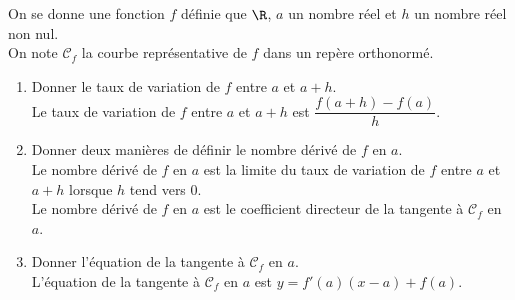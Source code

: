 \documentclass[a4paper,11pt,exos]{nsi}
\begin{document}
\newpage

\setcounter{section}{0}


\maketitle


On se donne une fonction $f$ définie que $\R$, $a$ un nombre réel et $h$ un nombre réel non nul.\\
On note $\mathcal{C}_f$ la courbe représentative de $f$ dans un repère orthonormé.
\begin{enumerate}
    \item Donner le taux de variation de $f$ entre $a$ et $a+h$.\\[.5em]
    \textcolor{UGLiBlue}{
        Le taux de variation de $f$ entre $a$ et $a+h$ est $\dfrac{f(a+h)-f(a)}{h}$.
    }
    \item Donner deux manières de définir le nombre dérivé de $f$ en $a$.\\[.5em]
    \textcolor{UGLiBlue}{
        Le nombre dérivé de $f$ en $a$ est la limite du taux de variation de $f$ entre $a$ et $a+h$ lorsque $h$ tend vers 0.\\
        Le nombre dérivé de $f$ en $a$ est le coefficient directeur de la tangente à $\mathcal{C}_f$ en $a$.
    }
    \item Donner l'équation de la tangente à $\mathcal{C}_f$ en $a$.\\[.5em]
    \textcolor{UGLiBlue}{
        L'équation de la tangente à $\mathcal{C}_f$ en $a$ est $y=f'(a)(x-a)+f(a)$.
    }
\end{enumerate}


{
}
\end{document}
